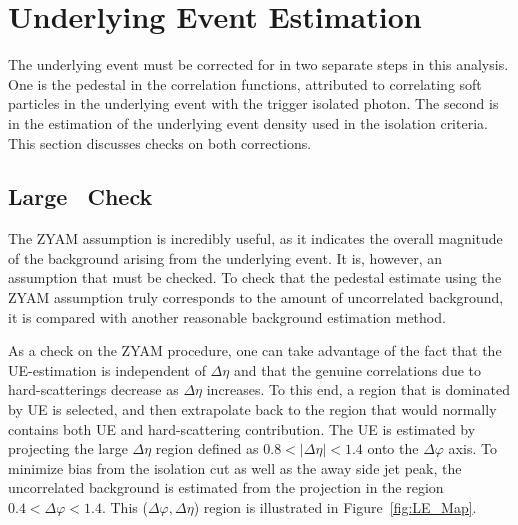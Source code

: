 \FloatBarrier

\section{Underlying Event Estimation}
The underlying event must be corrected for in two separate steps in this analysis. One is the pedestal in the correlation functions, attributed to correlating soft particles in the underlying event with the trigger isolated photon. The second is in the estimation of the underlying event density used in the isolation criteria. This section discusses checks on both corrections.

\subsection{Large \deltaeta~Check}

The ZYAM assumption is incredibly useful, as it indicates the overall magnitude of the background arising from the underlying event. It is, however, an assumption that must be checked. To check that the pedestal estimate using the ZYAM assumption truly corresponds to the amount of uncorrelated background, it is compared with another reasonable background estimation method.


As a check on the ZYAM procedure, one can take advantage of the fact that the UE-estimation is independent of $\Delta\eta$ and that the genuine correlations due to hard-scatterings decrease as $\Delta\eta$ increases. To this end, a region that is dominated by UE is selected, and then extrapolate back to the region that would normally contains both UE and hard-scattering contribution. The UE is estimated by projecting the large $\Delta\eta$ region defined as $0.8 < |\Delta\eta| < 1.4$ onto the $\Delta\varphi$ axis. To minimize bias from the isolation cut as well as the away side jet peak, the uncorrelated background is estimated from the projection in the region $0.4 < \Delta\varphi < 1.4$. This ($\Delta\varphi,\Delta\eta$) region is illustrated in Figure~\ref{fig:LE_Map}. 

